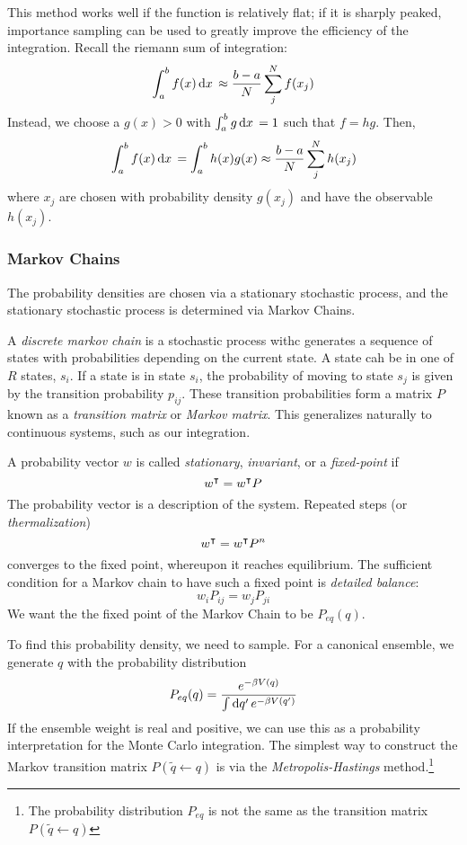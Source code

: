This method works well if the function is relatively flat; if it is sharply peaked, importance sampling can be used to greatly improve the efficiency of the integration. Recall the riemann sum of integration:
\[\int_a^b f(x)\d{x}\approx \frac{b-a}{N}\sum_j^N f(x_j)\]
Instead, we choose a \(g(x)>0\) with \(\int_a^b g\d{x}=1\) such that \(f = hg\). Then,
\[\int_a^b f(x)\d{x} =\int_a^b h(x)g(x) \approx \frac{b-a}{N}\sum_j^N h(x_j)\]
where \(x_j\) are chosen with probability density \(g(x_j)\) and have the observable \(h(x_j)\).

\subsubsection{Markov Chains}
The probability densities are chosen via a stationary stochastic process, and the stationary stochastic process is determined via Markov Chains. 

A \emph{discrete markov chain} is a stochastic process withc generates a sequence of states with probabilities depending on the current state. A state cah be in one of \(R\) states, \(s_i\). If a state is in state \(s_i\), the probability of moving to state \(s_j\) is given by the transition probability \(p_{ij}\). These transition probabilities form a matrix \(P\) known as a \emph{transition matrix} or \emph{Markov matrix}. This generalizes naturally to continuous systems, such as our integration.

A probability vector \(w\) is called \emph{stationary}, \emph{invariant}, or a \emph{fixed-point} if
\[w^\intercal = w^\intercal P\]
The probability vector is a description of the system. Repeated steps (or \emph{thermalization})
\[w^\intercal = w^\intercal P^n\]
converges to the fixed point, whereupon it reaches equilibrium. The sufficient condition for a Markov chain to have such a fixed point is \emph{detailed balance}:
\[w_iP_{ij} = w_j P_{ji}\]
We want the the fixed point of the Markov Chain to be \(P_{eq}(q)\).

To find this probability density, we need to sample. For a canonical ensemble, we generate \(q\) with the probability distribution
\[P_{eq}(q) = \frac{e^{-\beta V(q)}}{\int\d{q'}e^{-\beta V(q')}}\]
If the ensemble weight is real and positive, we can use this as a probability interpretation for the Monte Carlo integration. The simplest way to construct the Markov transition matrix \(P(\tilde q \leftarrow q)\) is via the \emph{Metropolis-Hastings} method.\footnote{The probability distribution \(P_{eq}\) is not the same as the transition matrix \(P(\tilde q\leftarrow q)\)} 


